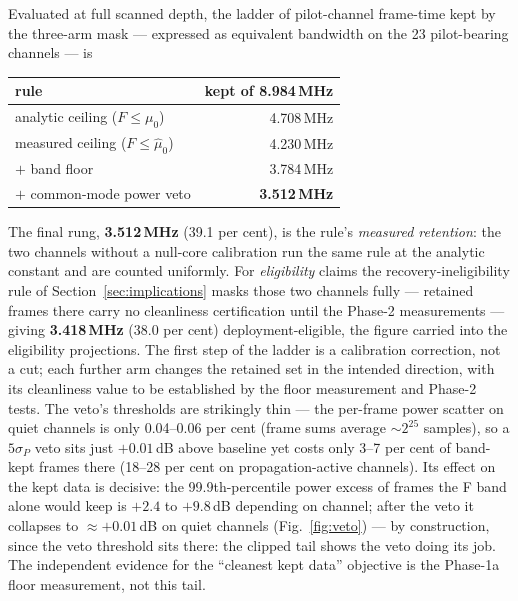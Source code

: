 Evaluated at full scanned depth, the ladder of pilot-channel frame-time
kept by the three-arm mask --- expressed as equivalent bandwidth on the 23
pilot-bearing channels --- is
\begin{center}
\begin{tabular}{lr}
  \toprule
  rule & kept of 8.984\,MHz \\
  \midrule
  analytic ceiling ($F \le \mu_0$) & 4.708\,MHz \\
  measured ceiling ($F \le \hat\mu_0$) & 4.230\,MHz \\
  $+$ band floor & 3.784\,MHz \\
  $+$ common-mode power veto & \textbf{3.512\,MHz} \\
  \bottomrule
\end{tabular}
\end{center}
The final rung, \textbf{3.512\,MHz} (39.1 per cent), is the rule's
\emph{measured retention}: the two channels without a null-core
calibration run the same rule at the analytic constant and are counted
uniformly. For \emph{eligibility} claims the recovery-ineligibility
rule of Section~\ref{sec:implications} masks those two channels fully
--- retained frames there carry no cleanliness certification until the
Phase-2 measurements --- giving \textbf{3.418\,MHz} (38.0 per cent)
deployment-eligible, the figure carried into the eligibility
projections. The first step
of the ladder is a calibration correction, not a cut; each further arm
changes the retained set in the intended direction, with its cleanliness
value to be established by the floor measurement and Phase-2 tests. The veto's thresholds are strikingly thin ---
the per-frame power scatter on quiet channels is only 0.04--0.06 per cent
(frame sums average $\sim 2^{25}$ samples), so a $5\sigma_P$ veto sits just
$+0.01$\,dB above baseline yet costs only 3--7 per cent of band-kept frames
there (18--28 per cent on propagation-active channels). Its effect on the
kept data is decisive: the 99.9th-percentile power excess of frames the F
band alone would keep is $+2.4$ to $+9.8$\,dB depending on channel; after
the veto it collapses to $\approx +0.01$\,dB on quiet channels
(Fig.~\ref{fig:veto}) --- by construction, since the veto threshold sits
there: the clipped tail shows the veto doing its job. The independent
evidence for the ``cleanest kept data'' objective is the Phase-1a floor
measurement, not this tail.

